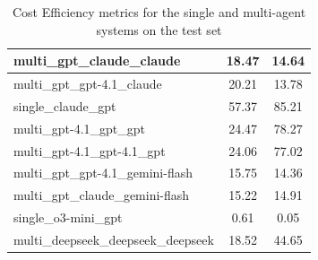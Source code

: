 \documentclass[manuscript, nonacm]{acmart}
\begin{document}
\begin{table}[h!]
\begin{tabular}{|l|c|c|}
multi\_gpt\_claude\_claude & 18.47 & 14.64 \\
\hline
multi\_gpt\_gpt-4.1\_claude & 20.21 & 13.78 \\
\hline
single\_claude\_gpt & 57.37 & 85.21 \\
\hline
multi\_gpt-4.1\_gpt\_gpt & 24.47 & 78.27 \\
\hline
multi\_gpt-4.1\_gpt-4.1\_gpt & 24.06 & 77.02 \\
\hline
multi\_gpt\_gpt-4.1\_gemini-flash & 15.75 & 14.36 \\
\hline
multi\_gpt\_claude\_gemini-flash & 15.22 & 14.91 \\
\hline
single\_o3-mini\_gpt & 0.61 & 0.05 \\
\hline
multi\_deepseek\_deepseek\_deepseek & 18.52 & 44.65 \\
\hline
\end{tabular}
\caption{Cost Efficiency metrics for the single and multi-agent systems on the test set}
\label{tab:cost_analysis}
\end{table}
\end{document}
